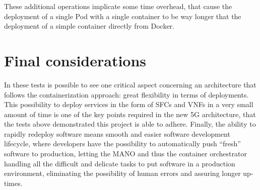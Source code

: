 These additional operations implicate some time overhead, that cause the
deployment of a single Pod with a single container to be way longer that the
deployment of a simple container directly from Docker.

\section{Final considerations}

In these tests is possible to see one critical aspect concerning an architecture
that follows the containerization approach: great flexibility in terms of
deployments. This possibility to deploy services in the form of SFCs and VNFs in
a very small amount of time is one of the key points required in the new 5G
architecture, that the tests above demonstrated this project is able to adhere.
Finally, the ability to rapidly redeploy software means smooth and easier
software development lifecycle, where developers have the possibility to
automatically push ``fresh'' software to production, letting the MANO and thus
the container orchestrator handling all the difficult and delicate tasks to put
software in a production environment, eliminating the possibility of human
errors and assuring longer up-times.
